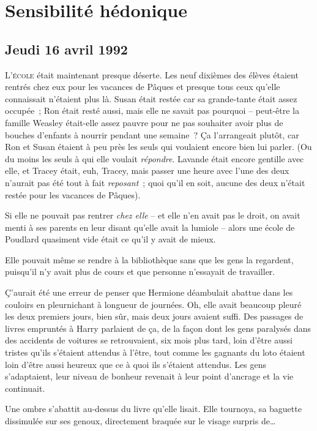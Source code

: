 \chapter{Sensibilité hédonique}

\section{Jeudi 16 avril 1992}

\lettrine{L}{'école}  était maintenant presque déserte. Les neuf dixièmes des élèves étaient rentrés chez eux pour les vacances de Pâques et presque tous ceux qu'elle connaissait n'étaient plus là. Susan était restée car sa grande-tante était assez occupée~; Ron était resté aussi, mais elle ne savait pas pourquoi -- peut-être la famille Weasley était-elle assez pauvre pour ne pas souhaiter avoir plus de bouches d'enfants à nourrir pendant une semaine~? Ça l'arrangeait plutôt, car Ron et Susan étaient à peu près les seuls qui voulaient encore bien lui parler. (Ou du moins les seuls à qui elle voulait \emph{répondre}. Lavande était encore gentille avec elle, et Tracey était, euh, Tracey, mais passer une heure avec l'une des deux n'aurait pas été tout à fait \emph{reposant}~; quoi qu'il en soit, aucune des deux n'était restée pour les vacances de Pâques).

Si elle ne pouvait pas rentrer \emph{chez elle} -- et elle n'en avait pas le droit, on avait menti à ses parents en leur disant qu'elle avait la lumiole -- alors une école de Poudlard quasiment vide était ce qu'il y avait de mieux.

Elle pouvait même se rendre à la bibliothèque sans que les gens la regardent, puisqu'il n'y avait plus de cours et que personne n'essayait de travailler.

Ç'aurait été une erreur de penser que Hermione déambulait abattue dans les couloirs en pleurnichant à longueur de journées. Oh, elle avait beaucoup pleuré les deux premiers jours, bien sûr, mais deux jours avaient suffi. Des passages de livres empruntés à Harry parlaient de ça, de la façon dont les gens paralysés dans des accidents de voitures se retrouvaient, six mois plus tard, loin d'être aussi tristes qu'ils s'étaient attendus à l'être, tout comme les gagnants du loto étaient loin d'être aussi heureux que ce à quoi ils s'étaient attendus. Les gens s'adaptaient, leur niveau de bonheur revenait à leur point d'ancrage et la vie continuait.

Une ombre s'abattit au-dessus du livre qu'elle lisait. Elle tournoya, sa baguette dissimulée sur ses genoux, directement braquée sur le visage surpris de…

